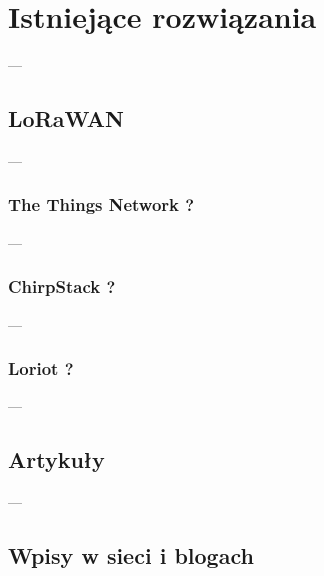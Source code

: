 
\chapter{Istniejące rozwiązania}
---
\section{LoRaWAN}
---
\subsection{The Things Network ?}
---
\subsection{ChirpStack ?}
---
\subsection{Loriot ?}
---
\section{Artykuły}
---
\section{Wpisy w sieci i blogach}
